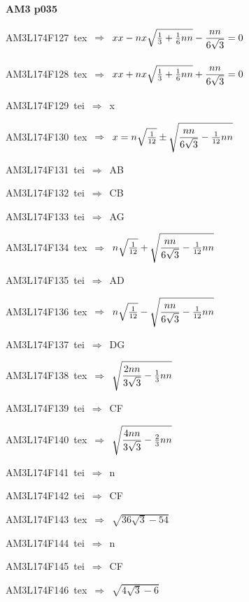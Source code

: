 \par\vfill\eject
{\bf\hfill AM3 p035\hfill\hbox{}}\par\bigskip
{\sixrm AM3L174F127\ {\sixit tex}\ }$\Rightarrow$\ $xx - nx\sqrt{{{1\over 3}} + {{1\over 6}}nn} - {\displaystyle\strut {nn}\over \displaystyle\strut {6\sqrt{ 3}}} = 0$\par\smallskip
{\sixrm AM3L174F128\ {\sixit tex}\ }$\Rightarrow$\ $xx + nx\sqrt{{{1\over 3}} + {{1\over 6}}nn} + {\displaystyle\strut {nn}\over \displaystyle\strut {6\sqrt{ 3}}} = 0$\par\smallskip
{\sixrm AM3L174F129\ {\sixit tei}\ }$\Rightarrow$\ {\tenit x}\par\smallskip
{\sixrm AM3L174F130\ {\sixit tex}\ }$\Rightarrow$\ $x = n\sqrt{{{1\over 12}}} \pm  \sqrt{{\displaystyle\strut {nn}\over \displaystyle\strut {6\sqrt{3}}} - {{1\over 12}}nn}$\par\smallskip
{\sixrm AM3L174F131\ {\sixit tei}\ }$\Rightarrow$\ AB\par\smallskip
{\sixrm AM3L174F132\ {\sixit tei}\ }$\Rightarrow$\ CB\par\smallskip
{\sixrm AM3L174F133\ {\sixit tei}\ }$\Rightarrow$\ AG\par\smallskip
{\sixrm AM3L174F134\ {\sixit tex}\ }$\Rightarrow$\ $n\sqrt{{{1\over 12}}} + \sqrt{{\displaystyle\strut {nn}\over \displaystyle\strut {6\sqrt{3}}} - {{1\over 12}}nn}$\par\smallskip
{\sixrm AM3L174F135\ {\sixit tei}\ }$\Rightarrow$\ AD\par\smallskip
{\sixrm AM3L174F136\ {\sixit tex}\ }$\Rightarrow$\ $n\sqrt{{{1\over 12}}} - \sqrt{{\displaystyle\strut {nn}\over \displaystyle\strut {6\sqrt{3}}} - {{1\over 12}}nn}$\par\smallskip
{\sixrm AM3L174F137\ {\sixit tei}\ }$\Rightarrow$\ DG\par\smallskip
{\sixrm AM3L174F138\ {\sixit tex}\ }$\Rightarrow$\ $\sqrt{{\displaystyle\strut {2nn}\over \displaystyle\strut {3\sqrt{3}}} - {{1\over 3}}nn}$\par\smallskip
{\sixrm AM3L174F139\ {\sixit tei}\ }$\Rightarrow$\ CF\par\smallskip
{\sixrm AM3L174F140\ {\sixit tex}\ }$\Rightarrow$\ $\sqrt{{\displaystyle\strut {4nn}\over \displaystyle\strut {3\sqrt{3}}} - {{2\over 3}}nn}$\par\smallskip
{\sixrm AM3L174F141\ {\sixit tei}\ }$\Rightarrow$\ {\tenit n}\par\smallskip
{\sixrm AM3L174F142\ {\sixit tei}\ }$\Rightarrow$\ CF\par\smallskip
{\sixrm AM3L174F143\ {\sixit tex}\ }$\Rightarrow$\ $\sqrt{36\sqrt{3} - 54}$\par\smallskip
{\sixrm AM3L174F144\ {\sixit tei}\ }$\Rightarrow$\ {\tenit n}\par\smallskip
{\sixrm AM3L174F145\ {\sixit tei}\ }$\Rightarrow$\ CF\par\smallskip
{\sixrm AM3L174F146\ {\sixit tex}\ }$\Rightarrow$\ $\sqrt{4\sqrt{3} - 6}$\par\smallskip

